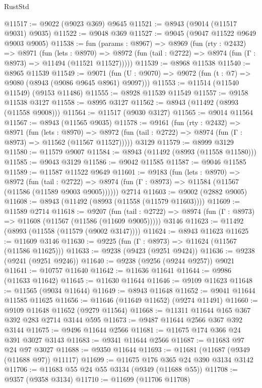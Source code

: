 \begin{lexlean}{RustStd}
\begin{coremodule}
{\begin{coremodule}
{{{{{{{{{{{{{{{{{{{{{{{{{{{{{{{{{{{{{{{@11517 := @9022 (@9023 @369) @9645
@11521 := @8943 (@9014 (@11517 @9031) @9035)
@11522 := @9048 @369
@11527 := @9045 (@9047 @11522 @9649 @9003 @9005)
@11538 := fun (params : @8967) =>
  @8969
    (fun (rty : @2432) =>
    @8971
      (fun (lets : @8970) =>
      @8972 (fun (tail : @2722) => @8974 (fun (Γ : @8973) => @11494 (@11521 @11527)))))
@11539 := @8968 @11538
@11540 := @8965 @11539
@11549 := @9071 (fun (U : @9070) => @9072 (fun (t : @7) => @9080 (@8943 (@9086 @9645 @8961) @9097)))
@11553 := @11514 (@11540 @11549) (@9153 @11486)
@11555 := @8928 @11539 @11549
@11557 := @9158 @11538 @3127
@11558 := @8995 @3127
@11562 := @8943 (@11492 (@8993 (@11558 @9008)))
@11564 := @11517 (@9030 @3127)
@11565 := @9014 @11564
@11567 := @8943 (@11565 @9035)
@11578 := @9161
    (fun (rty : @2432) =>
    @8971
      (fun (lets : @8970) =>
      @8972 (fun (tail : @2722) => @8974 (fun (Γ : @8973) => @11562 (@11567 @11527)))))
    @3129
@11579 := @8999 @3129
@11580 := @11579 @9007
@11584 := @8943 (@11492 (@8993 (@11558 @11580)))
@11585 := @9043 @3129
@11586 := @9042 @11585
@11587 := @9046 @11585
@11589 := @11587 @11522 @9649
@11601 := @9183
    (fun (lets : @8970) =>
    @8972
      (fun (tail : @2722) =>
      @8974 (fun (Γ : @8973) => @11584 (@11567 (@11586 (@11589 @9003 @9005))))))
    @2714
@11603 := @9002 (@2882 @9005)
@11608 := @8943 (@11492 (@8993 (@11558 (@11579 @11603))))
@11609 := @11589 @2714
@11618 := @9207
    (fun (tail : @2722) => @8974 (fun (Γ : @8973) => @11608 (@11567 (@11586 (@11609 @9005)))))
    @3146
@11623 := @11492 (@8993 (@11558 (@11579 (@9002 @3147))))
@11624 := @8943 @11623
@11625 := @11609 @3146
@11630 := @9225 (fun (Γ : @8973) => @11624 (@11567 (@11586 @11625)))
@11633 := @9238 (@9423 (@9251 @9424))
@11636 := @9238 (@9241 (@9251 @9246))
@11640 := @9238 (@9256 (@9244 @9257)) @9021
@11641 := @10757 @11640
@11642 := @11636 @11641
@11644 := @9986 (@11633 @11642)
@11645 := @11630 @11644
@11646 := @9109 @11623
@11648 := @11565 (@9034 @11644)
@11649 := @8943 @11648
@11652 := @9041 @11644 @11585 @11625
@11656 := @11646 (@11649 @11652) (@9274 @11491)
@11660 := @9109 @11648 @11652 (@9279 @11564)
@11668 := @11311 @11644 @165 @367 @392 @283 @2714 @3144 @595
@11673 := @9487 @11644 @2566 @367 @392 @3144
@11675 := @9496 @11644 @2566
@11681 := @11675 @174 @366 @24 @391 @3027 @3143
@11683 := @9341 @11644 @2566
@11687 := @11683 @97 @24 @97 @3027
@11688 := @9350 @11644
@11693 := @11681 (@11687 (@9349 (@11688 @97)) @11117)
@11699 := @11675 @176 @365 @24 @390 @3134 @3142
@11706 := @11683 @55 @24 @55 @3134 (@9349 (@11688 @55))
@11708 := @9357 (@9358 @3134)
@11710 := @11699 (@11706 @11708)
}}}}}}}}}}}}}}}}}}}}}}}}}}}}}}}}}}}}}}}
\end{coremodule}}
\end{coremodule}
\end{lexlean}
